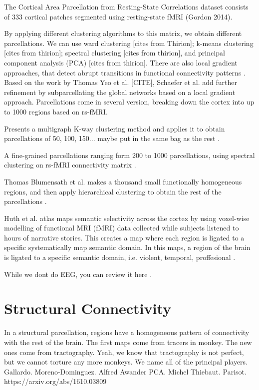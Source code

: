 The Cortical Area Parcellation from Resting-State Correlations dataset consists
of 333 cortical patches segmented using resting-state fMRI (Gordon 2014).

By applying different clustering algorithms to this matrix, we
obtain different parcellations. We can use ward clustering [cites from Thirion];
k-means clustering [cites from thirion]; spectral clustering [cites from thirion],
and principal component analysis (PCA) [cites from thirion]. There are also
local gradient approaches, that detect abrupt transitions in functional
connectivity patterns \cite{Wig2014, Schaefer2017}. 
Based on the work by Thomas Yeo et al. [CITE], Schaefer et al.  \cite{Schaefer2017}
add further refinement by subparcellating the global networks based on a local
gradient approach. Parcellations come in several version, breaking down the cortex
into up to 1000 regions based on rs-fMRI.

Presents a multigraph K-way clustering method and applies it to obtain 
parcellations of 50, 100, 150... maybe put in the same bag as the rest \cite{Shen2013}.


A fine-grained parcellations ranging form 200 to 1000 parcellations,
using spectral clustering on rs-fMRI connectivity matrix \cite{Craddock2011}.

Thomas Blumensath et al. makes a thousand small functionally homogeneous regions,
and then apply hierarchical clustering to obtain the rest of the parcellations \cite{Blumensath2013}.

Huth et al. atlas \cite{Huth2016} maps semantic selectivity across the cortex
by using voxel-wise modelling of functional MRI (fMRI) data collected while 
subjects listened to hours of narrative stories. This creates a map where each
region is ligated to a specific systematically map semantic domain. In this
maps, a region of the brain is ligated to a specific semantic domain, i.e.
violent, temporal, proffesional \cite{Huth2016}.

While we dont do EEG, you can review it here \cite{Shen2013}.



\section{Structural Connectivity}
In a structural parcellation, regions have a homogeneous pattern of connectivity
with the rest of the brain. The first maps come from tracers in monkey. The new
ones come from tractography. Yeah, we know that tractography is not perfect,
but we cannot torture any more monkeys. We name all of the principal players.
Gallardo.
Moreno-Dominguez.
Alfred Awander PCA.
Michel Thiebaut.
Parisot. 
https://arxiv.org/abs/1610.03809

